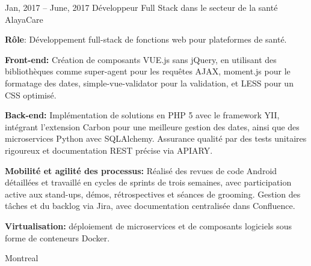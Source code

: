 \documentclass[
  a4paper,
   maincolor=cvblue,
   sectioncolor=cvblue,
   sidebarwidth=0.323\paperwidth,
]{fortysecondscv}
\begin{document}
\newpage
\makebacksidebar



\begin{cvtableNew}
  \cvitemRightNew
    {Jan, 2017 – June, 2017} %
    {Développeur Full Stack dans le secteur de la santé} %
    {AlayaCare} %
    {
      \vspace{0.1pt} %
      \fontsize{10.8pt}{12pt}\selectfont %
      \textbf{Rôle}: Développement full-stack de fonctions web pour plateformes de santé.\par
      \vspace{4pt}
      \textbf{Front-end:} Création de composants VUE.js sans jQuery, en utilisant des bibliothèques comme super-agent pour les requêtes AJAX, moment.js pour le formatage des dates, simple-vue-validator pour la validation, et LESS pour un CSS optimisé.\par
      \vspace{4pt}
      \textbf{Back-end:} Implémentation de solutions en PHP 5 avec le framework YII, intégrant l’extension Carbon pour une meilleure gestion des dates, ainsi que des microservices Python avec SQLAlchemy. Assurance qualité par des tests unitaires rigoureux et documentation REST précise via APIARY.\par
      \vspace{4pt}
      \textbf{Mobilité et agilité des processus:} Réalisé des revues de code Android détaillées et travaillé en cycles de sprints de trois semaines, avec participation active aux stand-ups, démos, rétrospectives et séances de grooming. Gestion des tâches et du backlog via Jira, avec documentation centralisée dans Confluence.\par
      \vspace{4pt}
      \textbf{Virtualisation:} déploiement de microservices et de composants logiciels sous forme de conteneurs Docker.\par
    }
    {Montreal} %

\vspace{2.2mm} %


\end{cvtableNew}
\end{document}
